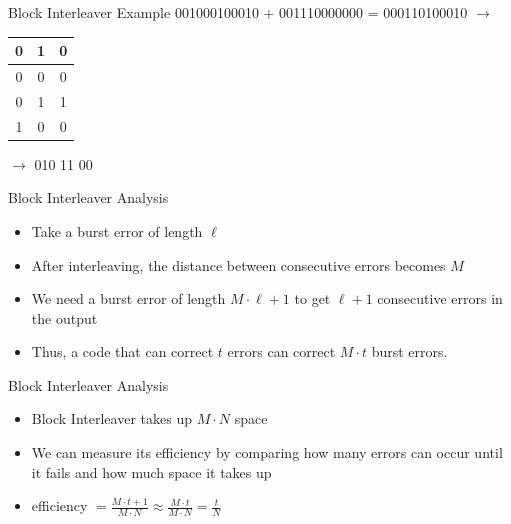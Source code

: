 \documentclass[aspectratio=169]{beamer}
\makeatletter
\newcommand{\err}[1]{{\color{sigma@alertred}#1}}
\makeatother
\begin{document}
\begin{frame}{Block Interleaver Example}
    001000100010 + 00\err{111}0000000 = 00\err{011}0100010 \pause $\to$ \\

    \begin{table}
        \centering
        \begin{tabular}{|c|c|c|}
            \hline 
            0 & \err{1} & 0 \\ \hline
            0 & 0 & 0 \\ \hline
            \err{0} & 1 & 1 \\ \hline
            \err{1} & 0 & 0 \\ \hline
        \end{tabular}
    \end{table} \pause

    $\to$ 0\err{1}0  \quad \err{0}11 \quad \err{1}00
\end{frame}


\begin{frame}{Block Interleaver Analysis}
    \begin{itemize}
        \item Take a burst error of length $\ell$
        \item After interleaving, the distance between consecutive errors becomes $M$
        \item We need a burst error of length $M \cdot \ell + 1$ to get $\ell + 1$ consecutive errors in the output \pause
        \item Thus, a code that can correct $t$ errors can correct $M \cdot t$ burst errors.
    \end{itemize}
\end{frame}


\begin{frame}{Block Interleaver Analysis}
    \begin{itemize}
        \item Block Interleaver takes up $M \cdot N$ space
        \item We can measure its efficiency by comparing how many errors can occur until it fails and how much space it takes up
        \item efficiency $= \frac {M \cdot t + 1}{M \cdot N} \approx \frac {M \cdot t}{M \cdot N} = \frac t N$
    \end{itemize}
\end{frame}
\end{document}
